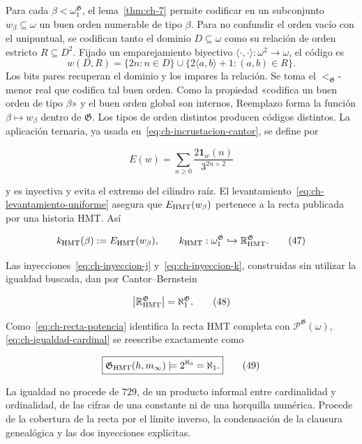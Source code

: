 Para cada \(\beta<\omega_1^{\mathfrak G}\), el lema~\ref{thm:ch-7} permite codificar en un
subconjunto \(w_\beta\subseteq\omega\) un buen orden numerable de tipo
\(\beta\). Para no confundir el orden vacío con el unipuntual, se codifican
tanto el dominio \(D\subseteq\omega\) como su relación de orden estricto
\(R\subseteq D^2\). Fijado un emparejamiento biyectivo
\(\langle\cdot,\cdot\rangle:\omega^2\to\omega\), el código es
\[
 w(D,R)=\{2n:n\in D\}\cup
        \{2\langle a,b\rangle+1:(a,b)\in R\}.
\]
Los bits pares recuperan el dominio y los impares la relación. Se toma el
\(<_{\mathfrak G}\)-menor real que codifica tal buen orden. Como la propiedad
«codifica un buen orden de tipo \(\beta\)» y el buen orden global son internos,
Reemplazo forma la función \(\beta\mapsto w_\beta\) dentro de
\(\mathfrak G\). Los tipos de orden distintos producen códigos distintos. La
aplicación ternaria, ya usada en~\eqref{eq:ch-incrustacion-cantor}, se define por

\[
 E(w)=\sum_{n\ge0}\frac{2\mathbf1_w(n)}{3^{2n+2}}
\tag{46}\label{eq:ch-incrustacion-ternaria}
\]

y es inyectiva y evita el extremo del cilindro raíz. El levantamiento~\eqref{eq:ch-levantamiento-uniforme}
asegura que \(E_{\rm HMT}(w_\beta)\) pertenece a la recta publicada por una
historia HMT. Así

\[
 k_{\rm HMT}(\beta):=E_{\rm HMT}(w_\beta),
 \qquad
 k_{\rm HMT}:\omega_1^{\mathfrak G}
 \hookrightarrow\mathbb R_{\rm HMT}^{\mathfrak G}.
\tag{47}\label{eq:ch-inyeccion-k}
\]

Las inyecciones~\eqref{eq:ch-inyeccion-j} y~\eqref{eq:ch-inyeccion-k}, construidas sin utilizar la igualdad buscada,
dan por Cantor--Bernstein

\[
 \bigl|\mathbb R_{\rm HMT}^{\mathfrak G}\bigr|
 =\aleph_1^{\mathfrak G}.
\tag{48}\label{eq:ch-igualdad-cardinal}
\]

Como~\eqref{eq:ch-recta-potencia} identifica la recta HMT completa con
\(\mathcal P^{\mathfrak G}(\omega)\), \eqref{eq:ch-igualdad-cardinal} se reescribe exactamente como

\[
 \boxed{
  \mathfrak G_{\rm HMT}(h,m_\infty)
  \models 2^{\aleph_0}=\aleph_1.}
\tag{49}\label{eq:ch-decision}
\]

La igualdad no procede de \(729\), de un producto informal entre cardinalidad
y ordinalidad, de las cifras de una constante ni de una horquilla numérica.
Procede de la cobertura de la recta por el límite inverso, la condensación de
la clausura genealógica y las dos inyecciones explícitas.

